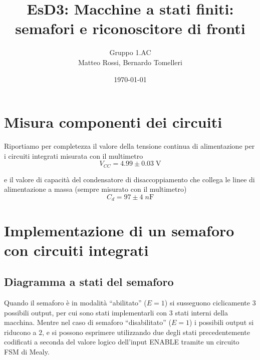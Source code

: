 \documentclass[10pt, a4paper, italian]{article}
\author{Gruppo 1.AC \\ Matteo Rossi, Bernardo Tomelleri}
\title{EsD3: Macchine a stati finiti: semafori e riconoscitore di fronti}
\begin{document}
\date{\today}
\maketitle

\section{Misura componenti dei circuiti}
Riportiamo per completezza il valore della tensione continua di
alimentazione per i circuiti integrati misurata con il multimetro
\[
V_{CC} = 4.99 \pm 0.03 \; \si{\V}
\]

e il valore di capacità del condensatore di disaccoppiamento che collega le
linee di alimentazione a massa (sempre misurato con il multimetro)
\[
C_d = 97 \pm 4 \; \si{n\F}
\]

\section{Implementazione di un semaforo con circuiti integrati}\label{sec: IC}
\subsection{Diagramma a stati del semaforo}
Quando il semaforo è in modalità ``abilitato'' ($E=1$) si susseguono
ciclicamente 3 possibili output, per cui sono stati implementarli con $3$ stati
interni della macchina. Mentre nel caso di semaforo ``disabilitato'' ($E=1$) i
possibili output si riducono a $2$, e si possono esprimere utilizzando due
degli stati precedentemente codificati a seconda del valore logico dell'input
ENABLE tramite un circuito FSM di Mealy.
\end{document}
